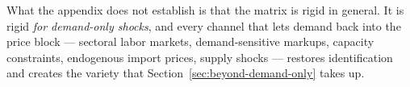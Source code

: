 What the appendix does not establish is that the matrix is rigid in general.
It is rigid \emph{for demand-only shocks}, and every channel that lets
demand back into the price block --- sectoral labor markets,
demand-sensitive markups, capacity constraints, endogenous import prices,
supply shocks --- restores identification and creates the variety that
Section~\ref{sec:beyond-demand-only} takes up.
